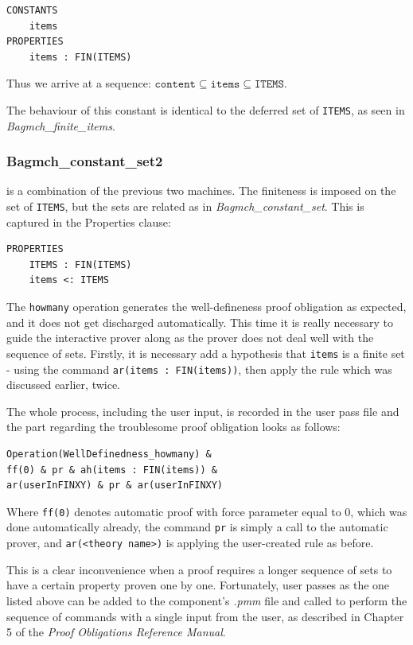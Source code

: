 \documentclass[12pt,journal,duplex]{IEEEtran}
\begin{document}
\begin{lstlisting}
CONSTANTS
	items
PROPERTIES
	items : FIN(ITEMS)
\end{lstlisting}
	Thus we arrive at a sequence: $\texttt{content} \subseteq \texttt{items} \subseteq \texttt{ITEMS}$.

	The behaviour of this constant is identical to the deferred set of \texttt{ITEMS}, as seen in \emph{Bagmch\_finite\_items}.

	\subsubsection{Bagmch\_constant\_set2} is a combination of the previous two machines. The finiteness is imposed on the set of \texttt{ITEMS}, but the sets are related as in \emph{Bagmch\_constant\_set}. This is captured in the Properties clause:
\begin{lstlisting}
PROPERTIES
	ITEMS : FIN(ITEMS)
	items <: ITEMS
\end{lstlisting}
	The \texttt{howmany} operation generates the well-defineness proof obligation as expected, and it does not get discharged automatically. This time it is really necessary to guide the interactive prover along as the prover does not deal well with the sequence of sets. Firstly, it is necessary add a hypothesis that \texttt{items} is a finite set - using the command \texttt{ar(items : FIN(items))}, then apply the rule which was discussed earlier, twice.

	The whole process, including the user input, is recorded in the user pass file and the part regarding the troublesome proof obligation looks as follows:

	\begin{lstlisting}
Operation(WellDefinedness_howmany) &
ff(0) & pr & ah(items : FIN(items)) &
ar(userInFINXY) & pr & ar(userInFINXY)
	\end{lstlisting}
	Where \texttt{ff(0)} denotes automatic proof with force parameter equal to 0, which was done automatically already, the command \texttt{pr} is simply a call to the automatic prover, and \texttt{ar(<theory name>)} is applying the user-created rule as before. 

	This is a clear inconvenience when a proof requires a longer sequence of sets to have a certain property proven one by one. Fortunately, user passes as the one listed above can be added to the component's \emph{.pmm} file and called to perform the sequence of commands with a single input from the user, as described in Chapter 5 of the \emph{Proof Obligations Reference Manual}.
\end{document}
